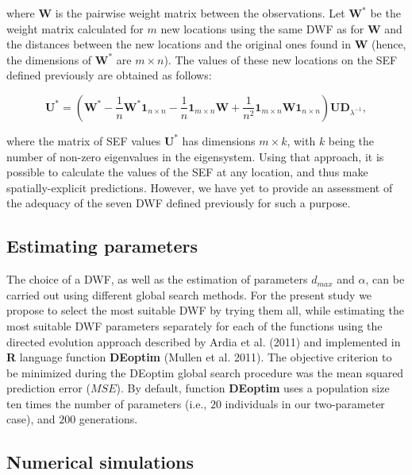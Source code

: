 \documentclass[
]{article}
\begin{document}
where \(\mathbf{W}\) is the pairwise weight matrix between the
observations. Let \(\mathbf{W}^*\) be the weight matrix calculated for
\(m\) new locations using the same DWF as for \(\mathbf{W}\) and the
distances between the new locations and the original ones found in
\(\mathbf{W}\) (hence, the dimensions of \(\mathbf{W}^*\) are
\(m \times n\)). The values of these new locations on the SEF defined
previously are obtained as follows:

\[
\label{eq7}\tag{7}
\mathbf{U}^* = \left( \mathbf{W}^* - \frac{1}{n} \mathbf{W}^* \mathbf{1}_{n \times n} - \frac{1}{n} \mathbf{1}_{m \times n} \mathbf{W} + \frac{1}{n^2} \mathbf{1}_{m \times n} \mathbf{W} \mathbf{1}_{n \times n}  \right) \mathbf{U} \mathbf{D}_{\lambda^{-1}},
\]

where the matrix of SEF values \(\mathbf{U}^*\) has dimensions
\(m \times k\), with \(k\) being the number of non-zero eigenvalues in
the eigensystem. Using that approach, it is possible to calculate the
values of the SEF at any location, and thus make spatially-explicit
predictions. However, we have yet to provide an assessment of the
adequacy of the seven DWF defined previously for such a purpose.

\subsection{Estimating parameters}\label{estimating-parameters}

The choice of a DWF, as well as the estimation of parameters \(d_{max}\)
and \(\alpha\), can be carried out using different global search
methods. For the present study we propose to select the most suitable
DWF by trying them all, while estimating the most suitable DWF
parameters separately for each of the functions using the directed
evolution approach described by Ardia et al. (2011) and implemented in
\textbf{R} language function \textbf{DEoptim} (Mullen et al. 2011). The
objective criterion to be minimized during the DEoptim global search
procedure was the mean squared prediction error (\(MSE\)). By default,
function \textbf{DEoptim} uses a population size ten times the number of
parameters (i.e., \(20\) individuals in our two-parameter case), and
\(200\) generations.

\subsection{Numerical simulations}\label{numerical-simulations}
\end{document}
